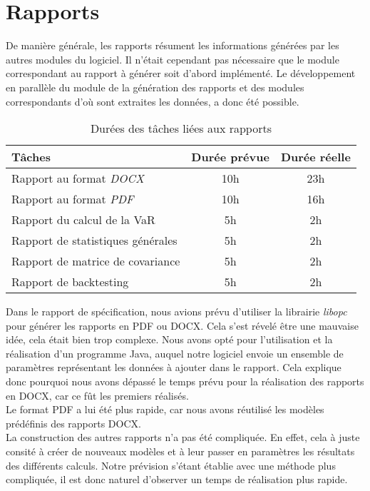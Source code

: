 \documentclass[a4paper]{report}
\begin{document}
\section{Rapports}
De manière générale, les rapports résument les informations générées par les autres modules du logiciel.
Il n'était cependant pas nécessaire que le module correspondant au rapport à générer soit d'abord implémenté.
Le développement en parallèle du module de la génération des rapports et des modules correspondants d'où sont extraites les données, a donc été possible.

\begin{table}[H]
\centering
  \begin{tabularx}{0.8\textwidth}{| X | c | c |}
    \hline
	Tâches & Durée prévue & Durée réelle \\
    \hline
    Rapport au format \emph{DOCX} &  10h & 23h\\
    Rapport au format \emph{PDF} &  10h & 16h\\
    Rapport du calcul de la VaR & 5h & 2h\\
    Rapport de statistiques générales & 5h & 2h\\
    Rapport de matrice de covariance & 5h & 2h\\
    Rapport de backtesting & 5h & 2h\\
    \hline
  \end{tabularx}
  \caption{Durées des tâches liées aux rapports}
\end{table}

Dans le rapport de spécification, nous avions prévu d'utiliser la librairie \emph{libopc} pour générer les rapports en PDF ou DOCX.
Cela s'est révelé être une mauvaise idée, cela était bien trop complexe.
Nous avons opté pour l'utilisation et la réalisation d'un programme Java, auquel notre logiciel envoie un ensemble de paramètres représentant les données à ajouter dans le rapport.
Cela explique donc pourquoi nous avons dépassé le temps prévu pour la réalisation des rapports en DOCX, car ce fût les premiers réalisés.\\

Le format PDF a lui été plus rapide, car nous avons réutilisé les modèles prédéfinis des rapports DOCX.\\

La construction des autres rapports n'a pas été compliquée.
En effet, cela à juste consité à créer de nouveaux modèles et à leur passer en paramètres les résultats des différents calculs.
Notre prévision s'étant établie avec une méthode plus compliquée, il est donc naturel d'observer un temps de réalisation plus rapide.
\end{document}
